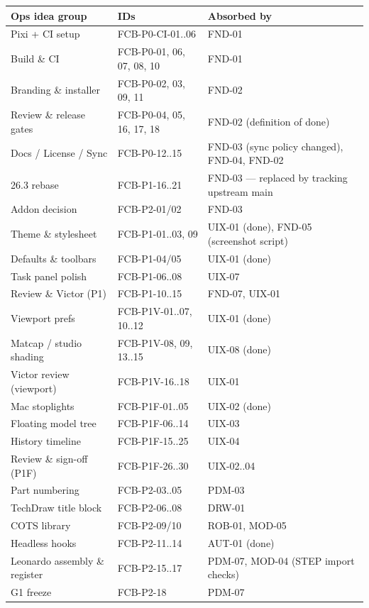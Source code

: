 \begin{center}
\small
\begin{longtable}{@{}p{4.6cm}p{4.2cm}p{6.6cm}@{}}
\toprule
Ops idea group & IDs & Absorbed by\\
\midrule\endhead
\bottomrule\endfoot
Pixi + CI setup & FCB-P0-CI-01..06 & FND-01\\
Build \& CI & FCB-P0-01, 06, 07, 08, 10 & FND-01\\
Branding \& installer & FCB-P0-02, 03, 09, 11 & FND-02\\
Review \& release gates & FCB-P0-04, 05, 16, 17, 18 & FND-02 (definition of done)\\
Docs / License / Sync & FCB-P0-12..15 & FND-03 (sync policy changed), FND-04, FND-02\\
26.3 rebase & FCB-P1-16..21 & FND-03 --- replaced by tracking upstream main\\
Addon decision & FCB-P2-01/02 & FND-03\\
Theme \& stylesheet & FCB-P1-01..03, 09 & UIX-01 (done), FND-05 (screenshot script)\\
Defaults \& toolbars & FCB-P1-04/05 & UIX-01 (done)\\
Task panel polish & FCB-P1-06..08 & UIX-07\\
Review \& Victor (P1) & FCB-P1-10..15 & FND-07, UIX-01\\
Viewport prefs & FCB-P1V-01..07, 10..12 & UIX-01 (done)\\
Matcap / studio shading & FCB-P1V-08, 09, 13..15 & UIX-08 (done)\\
Victor review (viewport) & FCB-P1V-16..18 & UIX-01\\
Mac stoplights & FCB-P1F-01..05 & UIX-02 (done)\\
Floating model tree & FCB-P1F-06..14 & UIX-03\\
History timeline & FCB-P1F-15..25 & UIX-04\\
Review \& sign-off (P1F) & FCB-P1F-26..30 & UIX-02..04\\
Part numbering & FCB-P2-03..05 & PDM-03\\
TechDraw title block & FCB-P2-06..08 & DRW-01\\
COTS library & FCB-P2-09/10 & ROB-01, MOD-05\\
Headless hooks & FCB-P2-11..14 & AUT-01 (done)\\
Leonardo assembly \& register & FCB-P2-15..17 & PDM-07, MOD-04 (STEP import checks)\\
G1 freeze & FCB-P2-18 & PDM-07\\

\end{longtable}
\end{center}

